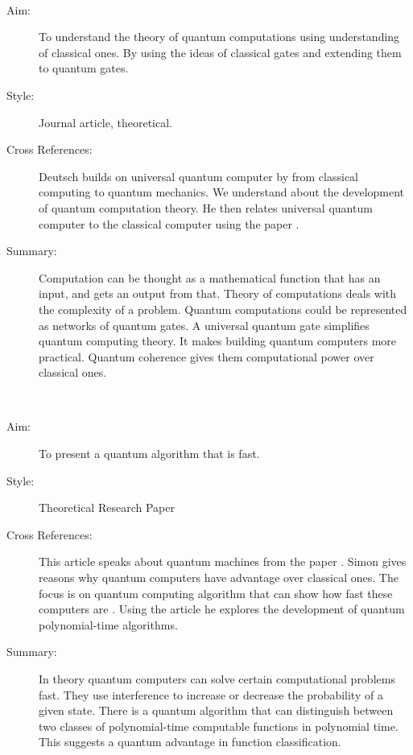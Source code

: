 \documentclass{Assignment}
\begin{document}
\newpage
\cite{Deutsch1989}~
	    \begin{description}
			\item [ Aim:]
		To understand the theory of quantum computations using understanding of classical ones.
		By using the ideas of classical gates and extending them to quantum gates.
		\item[Style:]
		Journal article, theoretical.
	
		\item[Cross References:]
		Deutsch builds on universal quantum computer by \cite{deutsch1985quantum} from classical computing to quantum mechanics. 
		We understand about the development of quantum computation theory.
		He then relates universal quantum computer to the classical computer using the paper \cite{Turing1936}.
		\item [Summary:]
		Computation can be thought as a mathematical function that has an input, and gets an output from that.
		Theory of computations deals with the complexity of a problem.
		Quantum computations could be represented as networks of quantum gates.
		A universal quantum gate simplifies quantum computing theory.
		It makes building quantum computers more practical. 
		Quantum coherence gives them computational power over classical ones.
	\end{description}

	\newpage

\cite{doi:10.1137/S0097539796298637}~
\begin{description}
	\item[Aim:]
	To present a quantum algorithm that is fast.
	\item [Style:]
	Theoretical Research Paper
	\item [Cross References:]
	This article speaks about quantum machines from the paper \cite{Deutsch1989}.
	Simon gives reasons why quantum computers have advantage over classical ones.
	The focus is on quantum computing algorithm that can show how fast these computers are	.
	Using the article \cite{shor1994algorithms} he explores the development of quantum polynomial-time algorithms.
	\item[Summary:]
	 In theory quantum computers can solve certain computational problems fast.
	They use interference to increase or decrease the probability of a given state.
	There is a quantum algorithm that can distinguish between two classes of polynomial-time computable functions in polynomial time. 
	This suggests a quantum advantage in function classification. 
\end{description}
\end{document}
